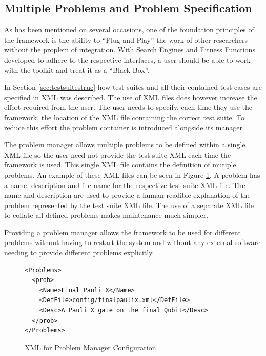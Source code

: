 \subsection{Multiple Problems and Problem Specification}
\label{sec:problemman}
As has been mentioned on several occasions, one of the foundation principles of the framework is the ability to ``Plug and Play'' the work of other researchers without the proplem of integration.
With Search Engines and Fitness Functions developed to adhere to the respective interfaces, a user should be able to work with the toolkit and treat it as a ``Black Box''.

In Section \ref{sec:testsuitestruc} how test suites and all their contained test cases are specified in XML was described.
The use of XML files does however increase the effort required from the user.
The user needs to specify, each time they use the framework, the location of the XML file containing the correct test suite.
To reduce this effort the problem container is introduced alongside its manager.

The problem manager allows multiple problems to be defined within a single XML file so the user need not provide the test suite XML each time the framework is used.
This single XML file contains the definition of mutiple problems.
An example of these XML files can be seen in Figure \ref{code:probmanconfig}.
A problem has a name, description and file name for the respective test suite XML file.
The name and description are used to provide a human readible explanation of the problem represented by the test suite XML file.
The use of a separate XML file to collate all defined problems makes maintenance much simpler.

Providing a problem manager allows the framework to be used for different problems without having to restart the system and without any external software needing to provide different problems explicitly.

\lstset{language=XML}
\begin{figure}
\begin{lstlisting}
<Problems>
  <prob>
    <Name>Final Pauli X</Name>
    <DefFile>config/finalpaulix.xml</DefFile>
    <Desc>A Pauli X gate on the final Qubit</Desc>
  </prob>
</Problems>
\end{lstlisting}
\caption{XML for Problem Manager Configuration}
\label{code:probmanconfig}
\end{figure}

